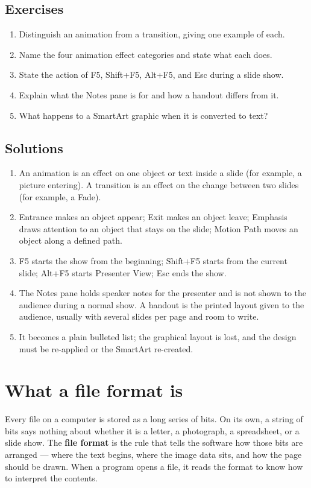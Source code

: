 \subsection*{Exercises}
\begin{enumerate}[label=\arabic*.]
  \item Distinguish an animation from a transition, giving one example of each.
  \item Name the four animation effect categories and state what each does.
  \item State the action of F5, Shift+F5, Alt+F5, and Esc during a slide show.
  \item Explain what the Notes pane is for and how a handout differs from it.
  \item What happens to a SmartArt graphic when it is converted to text?
\end{enumerate}

\subsection*{Solutions}
\begingroup\small
\begin{enumerate}[label=\arabic*.]
  \item An animation is an effect on one object or text inside a slide (for
    example, a picture entering). A transition is an effect on the change
    between two slides (for example, a Fade).
  \item Entrance makes an object appear; Exit makes an object leave; Emphasis
    draws attention to an object that stays on the slide; Motion Path moves an
    object along a defined path.
  \item F5 starts the show from the beginning; Shift+F5 starts from the current
    slide; Alt+F5 starts Presenter View; Esc ends the show.
  \item The Notes pane holds speaker notes for the presenter and is not shown
    to the audience during a normal show. A handout is the printed layout given
    to the audience, usually with several slides per page and room to write.
  \item It becomes a plain bulleted list; the graphical layout is lost, and the
    design must be re-applied or the SmartArt re-created.
\end{enumerate}
\endgroup

\section{What a file format is}
Every file on a computer is stored as a long series of bits. On its own, a
string of bits says nothing about whether it is a letter, a photograph, a
spreadsheet, or a slide show. The \textbf{file format} is the rule that tells
the software how those bits are arranged --- where the text begins, where the
image data sits, and how the page should be drawn. When a program opens a
file, it reads the format to know how to interpret the contents.

